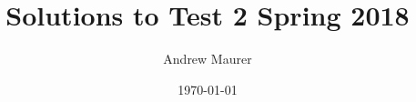 \documentclass{article}
\begin{document}
\title{Solutions to Test 2 Spring 2018}
\date{\today}
\author{Andrew Maurer}

\maketitle
\end{document}
